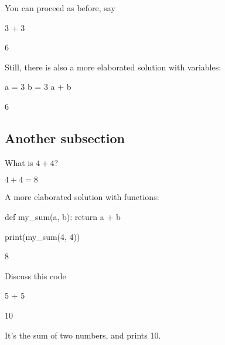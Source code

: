 \documentclass{book}
\begin{document}
\begin{additionalinformation}
You can proceed as before, say
\begin{pycell}
3 + 3
\end{pycell}
\begin{pyexpectedoutput}
6
\end{pyexpectedoutput}

Still, there is also a more elaborated solution with variables:

\begin{pycell}
a = 3
b = 3
a + b
\end{pycell}
\begin{pyexpectedoutput}
6
\end{pyexpectedoutput}
\end{additionalinformation}

\subsection{Another subsection}

\begin{exercise}
  What is \(4 + 4\)?
\end{exercise}

\begin{solution}
  \(4 + 4 = 8\)
\end{solution}

\begin{additionalinformation}
A more elaborated solution with functions:

\begin{pycell}
def my_sum(a, b):
    return a + b

print(my_sum(4, 4))
\end{pycell}
\begin{pyexpectedoutput}
8
\end{pyexpectedoutput}
\end{additionalinformation}

\begin{exercise}
Discuss this code

\begin{pycell}
5 + 5
\end{pycell}
\begin{pyexpectedoutput}
10
\end{pyexpectedoutput}
\end{exercise}

\begin{solution}
It's the sum of two numbers, and prints 10.
\end{solution}
\end{document}
